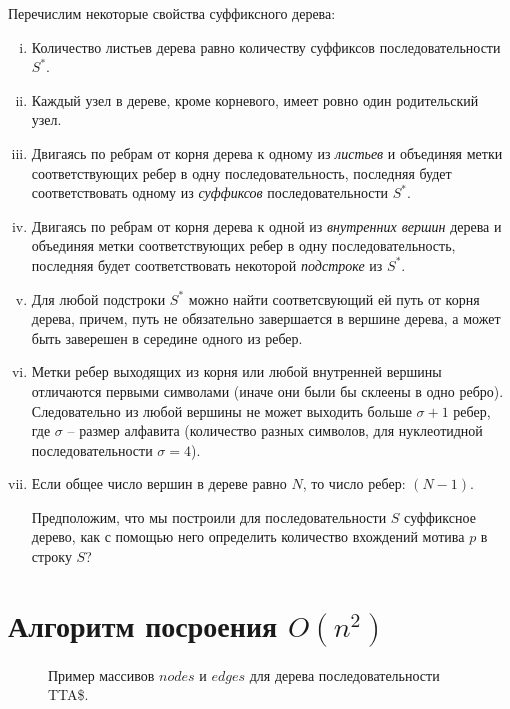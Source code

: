 \documentclass[letterpaper, 11pt]{article}
\begin{document}
\clearpage
Перечислим некоторые свойства суффиксного дерева:
\begin{enumerate}[(i)]
\item
Количество листьев дерева равно количеству суффиксов последовательности $S^*$.
\item
Каждый узел в дереве, кроме корневого, имеет ровно один родительский узел.
\item
Двигаясь по ребрам от корня дерева к одному из \textit{листьев} и объединяя метки соответствующих ребер в одну последовательность, последняя будет соответствовать одному из \textit{суффиксов} последовательности $S^*$.
\item
Двигаясь по ребрам от корня дерева к одной из \textit{внутренних вершин} дерева и объединяя метки соответствующих ребер в одну последовательность, последняя будет соответствовать некоторой \textit{подстроке} из $S^*$.
\item
Для любой подстроки $S^*$ можно найти соответсвующий ей путь от корня дерева, причем, путь не обязательно завершается в вершине дерева, а может быть заверешен в середине одного из ребер.
\item
Метки ребер выходящих из корня или любой внутренней вершины отличаются первыми символами (иначе они были бы склеены в одно ребро). Следовательно из любой вершины не может выходить больше $\sigma + 1$ ребер, где $\sigma$ -- размер алфавита (количество разных символов, для нуклеотидной последовательности $\sigma = 4$).
\item
Если общее число вершин в дереве равно $N$, то число ребер: $(N - 1)$.

Предположим, что мы построили для последовательности $S$ суффиксное дерево, как с помощью него определить количество вхождений мотива $p$ в строку $S$?
\end{enumerate}

\clearpage
\section{Алгоритм посроения $O(n^2)$}

\begin{figure}[H]
  \caption{Пример массивов $nodes$ и $edges$ для дерева последовательности TTA\$.}
\end{figure}
\end{document}
